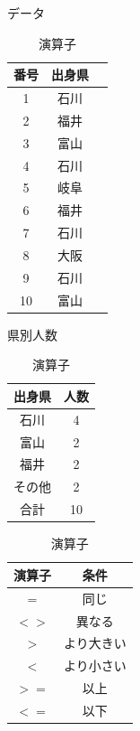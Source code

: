 \begin{table}
\begin{minipage}{0.32\hsize}
    \centering
    \makeatletter
    \def\@captype{table}
    \makeatother
    \caption{データ}
    \begin{tabular}{|c|c|c|}
      \hline
      番号& 出身県\\ \hline
      1   & 石川  \\ \hline
      2   & 福井  \\ \hline
      3   & 富山  \\ \hline
      4   & 石川  \\ \hline
      5   & 岐阜  \\ \hline
      6   & 福井  \\ \hline
      7   & 石川  \\ \hline
      8   & 大阪  \\ \hline
      9   & 石川  \\ \hline
      10  & 富山  \\ \hline
    \end{tabular}
    \label{tab:countif_data}
\end{minipage}
\begin{minipage}{0.32\hsize}
    \centering
    \makeatletter
    \def\@captype{table}
    \makeatother
    \caption{県別人数}
    \begin{tabular}{|c|c|}
      \hline
      出身県   & 人数\\ \hline
      石川     & 4\\ \hline
      富山     & 2\\ \hline
      福井     & 2\\ \hline
      その他   & 2\\ \hline
      合計     & 10\\ \hline
    \end{tabular}
    \label{tab:home}
\end{minipage}
\begin{minipage}{0.32\hsize}
    \centering
    \makeatletter
    \def\@captype{table}
    \makeatother
    \caption{演算子}
    \begin{tabular}{|c|c|}
      \hline
      演算子 & 条件\\ \hline
      $=$      & 同じ\\ \hline
      $<>$     & 異なる\\ \hline
      $>$      & より大きい\\ \hline
      $<$      & より小さい\\ \hline
      $>=$     & 以上\\ \hline
      $<=$     & 以下\\ \hline
    \end{tabular}
    \label{tab:countif_operator}
\end{minipage}
\end{table}


